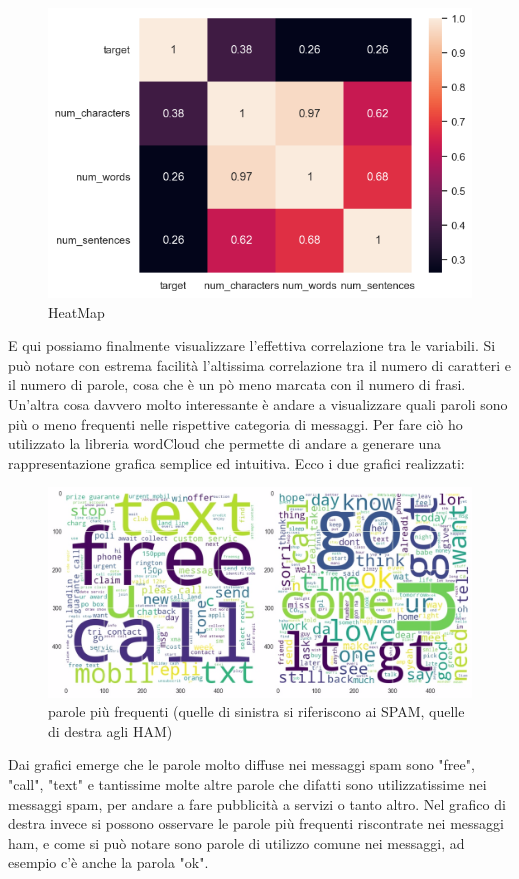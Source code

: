 \documentclass[]{article}
\begin{document}
        \begin{figure}[H]
            \centering
            \includegraphics[width=0.7\linewidth]{images/matrice_corr.png}
            \caption{HeatMap}
            \label{fig:enter-label}
        \end{figure}

        E qui possiamo finalmente visualizzare l'effettiva correlazione tra le variabili. Si può notare con estrema facilità l'altissima correlazione tra il numero di caratteri e il numero di parole, cosa che è un pò meno marcata con il numero di frasi.\\
        Un'altra cosa davvero molto interessante è andare a visualizzare quali paroli sono più o meno frequenti nelle rispettive categoria di messaggi. Per fare ciò ho utilizzato la libreria wordCloud che permette di andare a generare una rappresentazione grafica semplice ed intuitiva. Ecco i due grafici realizzati:

        \begin{figure}[H]
            \centering
            \includegraphics[width=0.7\linewidth]{images/wordCloudSpam.jpg}
            \caption{parole più frequenti (quelle di sinistra si riferiscono ai SPAM, quelle di destra agli HAM)}
            \label{fig:enter-label}
        \end{figure}

        Dai grafici emerge che le parole molto diffuse nei messaggi spam sono "free", "call", "text" e tantissime molte altre parole che difatti sono utilizzatissime nei messaggi spam, per  andare a fare pubblicità a servizi o tanto altro. Nel grafico di destra invece si possono osservare le parole più frequenti riscontrate nei messaggi ham, e come si può notare sono parole di utilizzo comune nei messaggi, ad esempio c'è anche la parola "ok".
\end{document}
